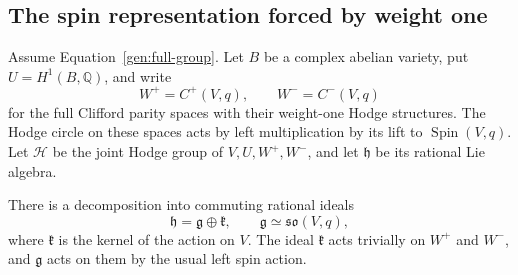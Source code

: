 \subsection{The spin representation forced by weight one}

Assume Equation~\eqref{gen:full-group}.  Let $B$ be a complex abelian
variety, put $U=H^1(B,\mathbb Q)$, and write
\[
 W^+=C^+(V,q),\qquad W^-=C^-(V,q)
\]
for the full Clifford parity spaces with their weight-one Hodge
structures.  The Hodge circle on these spaces acts by left multiplication
by its lift to $\operatorname{Spin}(V,q)$.
Let $\mathcal H$ be the joint Hodge group of $V,U,W^+,W^-$, and let
$\mathfrak h$ be its rational Lie algebra.

\begin{lemma}\label{gen:joint-group}
There is a decomposition into commuting rational ideals
\[
 \mathfrak h=\mathfrak g\oplus\mathfrak k,
 \qquad \mathfrak g\simeq\mathfrak{so}(V,q),
\]
where $\mathfrak k$ is the kernel of the action on $V$.
The ideal $\mathfrak k$ acts trivially on $W^+$ and $W^-$, and
$\mathfrak g$ acts on them by the usual left spin action.
\end{lemma}

